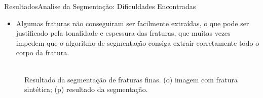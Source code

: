 \documentclass{beamer}
\begin{document}
\begin{frame}{Resultados}{Analise da Segmentação: Dificuldades Encontradas}
    \begin{itemize}
        \item Algumas fraturas não conseguiram ser facilmente extraídas, o que pode ser justificado pela tonalidade e espessura das fraturas, que muitas vezes impedem que o algoritmo de segmentação consiga extrair corretamente todo o corpo da fratura.
    \end{itemize}

    \begin{figure}[!htb]
        \centering
         \hspace*{0.1cm}
        \\
        \scriptsize{Resultado da segmentação de fraturas finas. (o) imagem com fratura sintética; (p) resultado da segmentação.}
    \end{figure}
\end{frame}
\end{document}
